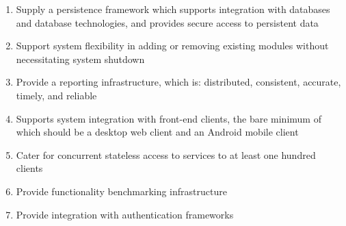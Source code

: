 \begin{enumerate}
		\item Supply a persistence framework which supports integration with databases and database technologies, and provides secure access to persistent data
		\item Support system flexibility in adding or removing existing modules without necessitating system shutdown
		\item Provide a reporting infrastructure, which is: distributed, consistent, accurate, timely, and reliable
		\item Supports system integration with front-end clients, the bare minimum of which should be a desktop web client and an Android mobile client
		\item Cater for concurrent stateless access to services to at least one hundred clients
		\item Provide functionality benchmarking infrastructure
		\item Provide integration with authentication frameworks
\end{enumerate}